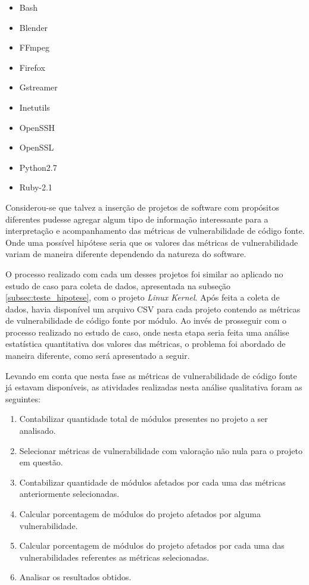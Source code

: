 \begin{multicols}{2}
\begin{itemize}
  \item Bash
  \item Blender
  \item FFmpeg
  \item Firefox
  \item Gstreamer
  \item Inetutils
  \item OpenSSH
  \item OpenSSL
  \item Python2.7
  \item Ruby-2.1
\end{itemize}
\end{multicols}

Considerou-se que talvez a inserção de projetos de software com propósitos diferentes
pudesse agregar algum tipo de informação interessante para a interpretação e acompanhamento
das métricas de vulnerabilidade de código fonte. Onde uma possível hipótese seria que os
valores das métricas de vulnerabilidade variam de maneira diferente dependendo da natureza 
do software.

O processo realizado com cada um desses projetos foi similar ao aplicado no estudo de caso
para coleta de dados, apresentada na subseção \ref{subsec:teste_hipotese}, com o projeto 
\emph{Linux Kernel}. Após feita a coleta de dados, havia disponível um arquivo CSV para
cada projeto contendo as métricas de vulnerabilidade de código fonte por módulo. Ao invés
de prosseguir com o processo realizado no estudo de caso, onde nesta etapa seria feita uma
análise estatística quantitativa dos valores das métricas, o problema foi abordado de 
maneira diferente, como será apresentado a seguir.

Levando em conta que nesta fase as métricas de vulnerabilidade de código fonte já estavam
disponíveis, as atividades realizadas nesta análise qualitativa foram as seguintes:

\begin{enumerate}
  \item Contabilizar quantidade total de módulos presentes no projeto a ser analisado.
  \item Selecionar métricas de vulnerabilidade com valoração não nula para o projeto em questão.
  \item Contabilizar quantidade de módulos afetados por cada uma das métricas anteriormente selecionadas.
  \item Calcular porcentagem de módulos do projeto afetados por alguma vulnerabilidade.
  \item Calcular porcentagem de módulos do projeto afetados por cada uma das vulnerabilidades 
    referentes as métricas selecionadas.
  \item Analisar os resultados obtidos.
\end{enumerate}


